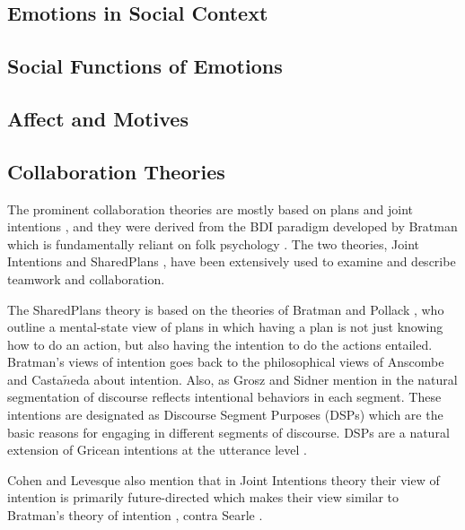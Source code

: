 \subsection{Emotions in Social Context}

\subsection{Social Functions of Emotions}

\subsection{Affect and Motives}

\subsection{Collaboration Theories}
\label{sec:collaboration-theory}

The prominent collaboration theories are mostly based on plans and joint
intentions
\cite{cohen:teamwork,grosz:plans-discourse,Litman:discourse-commonsense}, and
they were derived from the BDI paradigm developed by Bratman
\cite{bratman:intentions-plans} which is fundamentally reliant on folk
psychology \cite{ravenscroft:folk}. The two theories, Joint Intentions
\cite{cohen:teamwork} and SharedPlans \cite{grosz:plans-discourse}, have been
extensively used to examine and describe teamwork and collaboration.

The SharedPlans theory is based on the theories of Bratman and Pollack
\cite{bratman:plans-reasoning,pollack:plan-inference,pollack:plan-mental-attitudes},
who outline a mental-state view of plans in which having a plan is not just
knowing how to do an action, but also having the intention to do the actions
entailed. Bratman's views of intention goes back to the philosophical views of
Anscombe \cite{anscombe:intention} and Casta$\tilde{n}$eda
\cite{castaneda:thinking} about intention. Also, as Grosz and Sidner mention in
\cite{grosz:plans-discourse} the natural segmentation of discourse reflects
intentional behaviors in each segment. These intentions are designated as
Discourse Segment Purposes (DSPs) which are the basic reasons for engaging in
different segments of discourse. DSPs are a natural extension of Gricean
intentions at the utterance level \cite{neale:grice-language}.

Cohen and Levesque also mention that in Joint Intentions theory their view of
intention is primarily future-directed \cite{cohen:intention-commitment} which
makes their view similar to Bratman's theory of intention
\cite{bratman:intention}, contra Searle \cite{searle:collective}.

